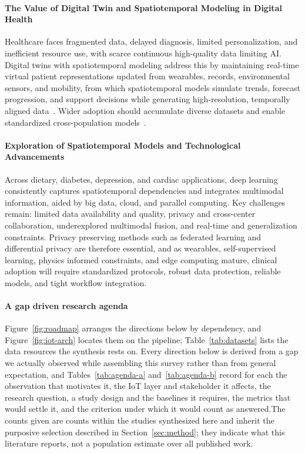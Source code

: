\documentclass[journal]{IEEEtran}
\newif\ifsubmission
\begin{document}
\paragraph{The Value of Digital Twin and Spatiotemporal Modeling in Digital Health}

Healthcare faces fragmented data, delayed diagnosis, limited personalization, and inefficient resource use, with scarce continuous high-quality data limiting AI. Digital twins with spatiotemporal modeling address this by maintaining real-time virtual patient representations updated from wearables, records, environmental sensors, and mobility, from which spatiotemporal models simulate trends, forecast progression, and support decisions while generating high-resolution, temporally aligned data~\cite{ali2024spatialtwins}. Wider adoption should accumulate diverse datasets and enable standardized cross-population models~\cite{bilal2025cityseircast}.

\paragraph{Exploration of Spatiotemporal Models and Technological Advancements}

Across dietary, diabetes, depression, and cardiac applications, deep learning consistently captures spatiotemporal dependencies and integrates multimodal information, aided by big data, cloud, and parallel computing. Key challenges remain: limited data availability and quality, privacy and cross-center collaboration, underexplored multimodal fusion, and real-time and generalization constraints. Privacy preserving methods such as federated learning and differential privacy are therefore essential, and as wearables, self-supervised learning, physics informed constraints, and edge computing mature, clinical adoption will require standardized protocols, robust data protection, reliable models, and tight workflow integration.
\paragraph{A gap driven research agenda} Figure~\ref{fig:roadmap} arranges the directions below by dependency, and Figure~\ref{fig:iot-arch} locates them on the pipeline; Table~\ref{tab:datasets} lists the data resources the synthesis rests on. Every direction below is derived from a gap we actually observed while assembling this survey rather than from general expectation, \ifsubmission and we state for each the observation that motivates it and the study it calls for.\else and Tables~\ref{tab:agenda-a} and~\ref{tab:agenda-b} record for each the observation that motivates it, the IoT layer and stakeholder it affects, the research question, a study design and the baselines it requires, the metrics that would settle it, and the criterion under which it would count as answered.\fi The counts given are counts within the studies synthesized here and inherit the purposive selection described in Section~\ref{sec:method}; they indicate what this literature reports, not a population estimate over all published work.
\end{document}
